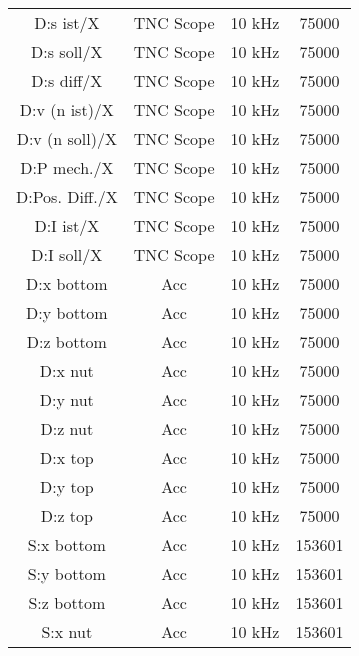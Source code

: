 \begin{center}
\begin{longtable}{c c c c}
 D:s ist/X & TNC Scope & 10 kHz & 75000 \\

 D:s soll/X & TNC Scope & 10 kHz & 75000 \\ 

 D:s diff/X & TNC Scope & 10 kHz & 75000 \\ 

 D:v (n ist)/X & TNC Scope & 10 kHz & 75000 \\ 

 D:v (n soll)/X & TNC Scope & 10 kHz & 75000 \\ 

 D:P mech./X & TNC Scope & 10 kHz & 75000 \\ 
 
 D:Pos. Diff./X & TNC Scope & 10 kHz & 75000 \\ 

 D:I ist/X & TNC Scope & 10 kHz & 75000 \\ 

 D:I soll/X & TNC Scope & 10 kHz & 75000 \\ 

 D:x bottom & Acc & 10 kHz & 75000 \\ 

 D:y bottom & Acc & 10 kHz & 75000 \\ 

 D:z bottom & Acc & 10 kHz & 75000 \\ 

 D:x nut & Acc & 10 kHz & 75000 \\ 

 D:y nut & Acc & 10 kHz & 75000 \\ 

 D:z nut & Acc & 10 kHz & 75000 \\ 

 D:x top & Acc & 10 kHz & 75000 \\

 D:y top & Acc & 10 kHz & 75000 \\ 

 D:z top & Acc & 10 kHz & 75000 \\ 

 S:x bottom & Acc & 10 kHz & 153601 \\ 

 S:y bottom & Acc & 10 kHz & 153601 \\ 

 S:z bottom & Acc & 10 kHz & 153601 \\ 

 S:x nut & Acc & 10 kHz & 153601 \\ 


\end{longtable}
\end{center}
